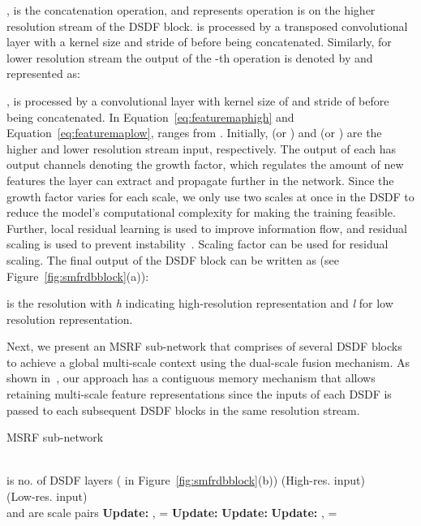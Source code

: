 \documentclass[journal,twoside,web]{IEEEtran}
\begin{document}
,  is the concatenation operation, and  represents  operation is on the higher resolution stream of the \ac{DSDF} block.  is processed by a transposed convolutional layer with a  kernel size and stride of  before being concatenated.
Similarly, for lower resolution stream the output of the -th  operation is denoted by  and represented as:

,  is processed by a convolutional layer with kernel size of  and stride of  before being concatenated.
In Equation~\ref{eq:featuremaphigh} and Equation~\ref{eq:featuremaplow},  ranges from . Initially,  (or ) and  (or ) are the higher and lower resolution stream input, respectively. The output of each  has  output channels denoting the growth factor, which regulates the amount of new features the layer can extract and propagate further in the network. Since the growth factor varies for each scale, we only use two scales at once in the \ac{DSDF} to reduce the model's computational complexity for making the training feasible. Further, local residual learning is used to improve information flow, and residual scaling is used to prevent instability~\cite{lim2017enhanced,szegedy2017inception}. Scaling factor  can be used for residual scaling. The final output of the \ac{DSDF} block can be written as (see Figure~\ref{fig:smfrdbblock}(a)): 

  is the resolution with \textit{h} indicating high-resolution representation and \textit{l} for low resolution representation.

Next, we present an MSRF sub-network that comprises of several \ac{DSDF} blocks to achieve a global multi-scale context using the dual-scale fusion mechanism. As shown in~\cite{zhang2018residual}, our approach has a contiguous memory mechanism that allows retaining multi-scale feature representations since the inputs of each \ac{DSDF} is passed to each subsequent \ac{DSDF} blocks in the same resolution stream.


\begin{algorithm}
\caption{\ac{MSRF} sub-network} \begin{algorithmic}[1]
\\
\STATE  is no. of DSDF layers ( in Figure~\ref{fig:smfrdbblock}(b)) 
\STATE   (High-res. input) \\
\STATE   (Low-res. input)\\
\STATE   and  are scale pairs
\STATE 
\STATE \textbf{Update:} ,  = 
    \STATE 
    \STATE\textbf{Update:} 
    \STATE 
    \STATE \textbf{Update:}
\ENDFOR
\STATE 
\STATE \textbf{Update:} ,  = 
\end{algorithmic}
\label{alg:algo1}
\end{algorithm}
\end{document}
